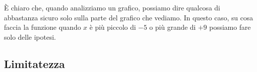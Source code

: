 \begin{osservazione}
È chiaro che, quando analizziamo un grafico, possiamo dire qualcosa di 
abbastanza sicuro solo sulla parte del grafico che vediamo. 
In questo caso, su cosa faccia la funzione quando 
\(x\) è più piccolo di \(-5\) o più grande di \(+9\) possiamo fare solo 
delle ipotesi.
\end{osservazione}



% 
% 
% 
% 
% 
% 
% 
% 
% 
% 
% 
% 
% 
% 
% 
% 
% 



\subsection{Limitatezza}

